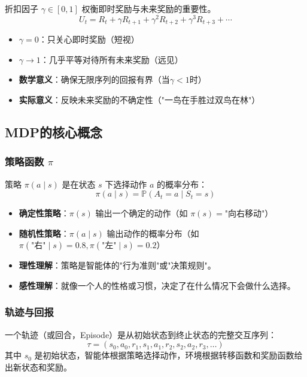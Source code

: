 \begin{definition}
折扣因子 $\gamma \in [0, 1]$ 权衡即时奖励与未来奖励的重要性。
\[
U_t = R_t + \gamma R_{t+1} + \gamma^2 R_{t+2} + \gamma^3 R_{t+3} + \cdots
\]
\begin{itemize}
    \item $\gamma = 0$：只关心即时奖励（短视）
    \item $\gamma \rightarrow 1$：几乎平等对待所有未来奖励（远见）
    \item \textbf{数学意义}：确保无限序列的回报有界（当$\gamma < 1$时）
    \item \textbf{实际意义}：反映未来奖励的不确定性（"一鸟在手胜过双鸟在林"）
\end{itemize}
\end{definition}

\subsection{MDP的核心概念}

\subsubsection{策略函数 $\pi$}

\begin{definition}[策略函数]
策略 $\pi(a \mid s)$ 是在状态 $s$ 下选择动作 $a$ 的概率分布：
\[
\pi(a \mid s) = \mathbb{P}(A_t = a \mid S_t = s)
\]
\begin{itemize}
    \item \textbf{确定性策略}：$\pi(s)$ 输出一个确定的动作（如 $\pi(s) = \text{"向右移动"}$）
    \item \textbf{随机性策略}：$\pi(a \mid s)$ 输出动作的概率分布（如 $\pi(\text{"右"} \mid s) = 0.8, \pi(\text{"左"} \mid s) = 0.2$）
    \item \textbf{理性理解}：策略是智能体的"行为准则"或"决策规则"。
    \item \textbf{感性理解}：就像一个人的性格或习惯，决定了在什么情况下会做什么选择。
\end{itemize}
\end{definition}

\subsubsection{轨迹与回报}

\begin{definition}[轨迹（Trajectory）]
一个轨迹（或回合，Episode）是从初始状态到终止状态的完整交互序列：
\[
\tau = (s_0, a_0, r_1, s_1, a_1, r_2, s_2, a_2, r_3, \ldots)
\]
其中 $s_0$ 是初始状态，智能体根据策略选择动作，环境根据转移函数和奖励函数给出新状态和奖励。
\end{definition}

